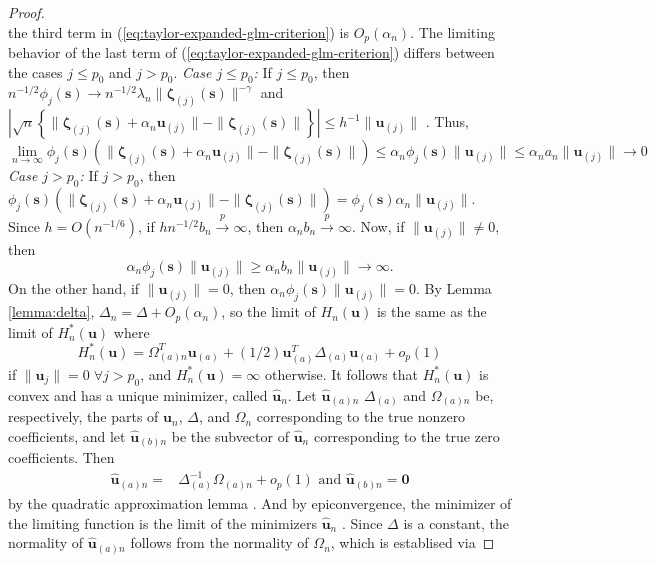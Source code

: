 \documentclass[authoryear,review, 12pt]{elsarticle}
\begin{document}
\begin{proof}
\[\]
the third term in (\ref{eq:taylor-expanded-glm-criterion}) is $O_{p}\left(\alpha_{n}\right)$.
The limiting behavior of the last term of (\ref{eq:taylor-expanded-glm-criterion})
differs between the cases $j\le p_{0}$ and $j>p_{0}$.
\emph{Case $j\le p_{0}$:} If $j\le p_{0}$, then $n^{-1/2}\phi_{j}(\bm{s})\to n^{-1/2}\lambda_{n}\|\bm{\zeta}_{(j)}(\bm{s})\|^{-\gamma}$
and $|\sqrt{n}\left\{ \|\bm{\zeta}_{(j)}(\bm{s})+\alpha_{n}\bm{u}_{(j)}\|-\|\bm{\zeta}_{(j)}(\bm{s})\|\right\} |\le h^{-1}\|\bm{u}_{(j)}\|$
. Thus, 
\[
\lim\limits _{n\to\infty}\phi_{j}(\bm{s})\left(\|\bm{\zeta}_{(j)}(\bm{s})+\alpha_{n}\bm{u}_{(j)}\|-\|\bm{\zeta}_{(j)}(\bm{s})\|\right)\le\alpha_{n}\phi_{j}(\bm{s})\|\bm{u}_{(j)}\|\le\alpha_{n}a_{n}\|\bm{u}_{(j)}\|\to0
\]
\emph{Case $j>p_{0}$:} If $j>p_{0}$, then $\phi_{j}(\bm{s})\left(\|\bm{\zeta}_{(j)}(\bm{s})+\alpha_{n}\bm{u}_{(j)}\|-\|\bm{\zeta}_{(j)}(\bm{s})\|\right)=\phi_{j}(\bm{s})\alpha_{n}\|\bm{u}_{(j)}\|$.
Since $h=O(n^{-1/6})$, if $hn^{-1/2}b_{n}\xrightarrow{p}\infty$,
then $\alpha_{n}b_{n}\xrightarrow{p}\infty$. Now, if $\|\bm{u}_{(j)}\|\ne0$,
then 
\[
\alpha_{n}\phi_{j}(\bm{s})\|\bm{u}_{(j)}\|\ge\alpha_{n}b_{n}\|\bm{u}_{(j)}\|\to\infty.
\]
On the other hand, if $\|\bm{u}_{(j)}\|=0$, then $\alpha_{n}\phi_{j}(\bm{s})\|\bm{u}_{(j)}\|=0$.
By Lemma \ref{lemma:delta}, $\Delta_{n}=\Delta+O_{p}\left(\alpha_{n}\right)$,
so the limit of $H_{n}(\bm{u})$ is the same as the limit of $H_{n}^{*}(\bm{u})$
where
\[
H_{n}^{*}(\bm{u})=\Omega_{(a)n}^{T}\bm{u}_{(a)}+(1/2)\bm{u}_{(a)}^{T}\Delta_{(a)}\bm{u}_{(a)}+o_{p}\left(1\right)
\]
if $\|\bm{u}_{j}\|=0\;\forall j>p_{0}$, and $H_{n}^{*}(\bm{u})=\infty$
otherwise. It follows that $H_{n}^{*}(\bm{u})$ is convex and has
a unique minimizer, called $\hat{\bm{u}}_{n}$. Let $\hat{\bm{u}}_{(a)n}$
$\Delta_{(a)}$ and $\Omega_{(a)n}$ be, respectively, the parts of
$\bm{u}_{n}$, $\Delta$, and $\Omega_{n}$ corresponding to the true
nonzero coefficients, and let $\hat{\bm{u}}_{(b)n}$ be the subvector
of $\hat{\bm{u}}_{n}$ corresponding to the true zero coefficients.
Then
\begin{align*}
\hat{\bm{u}}_{(a)n}= & \Delta_{(a)}^{-1}\Omega_{(a)n}+o_{p}\left(1\right)\text{ and }\hat{\bm{u}}_{(b)n}=\bm{0}
\end{align*}
by the quadratic approximation lemma \citep{Fan-Gijbels-1996}. And
by epiconvergence, the minimizer of the limiting function is the limit
of the minimizers $\hat{\bm{u}}_{n}$ \citep{Geyer-1994,Knight-Fu-2000}.
Since $\Delta$ is a constant, the normality of $\hat{\bm{u}}_{(a)n}$
follows from the normality of $\Omega_{n}$, which is establised via

\end{proof}
\end{document}
